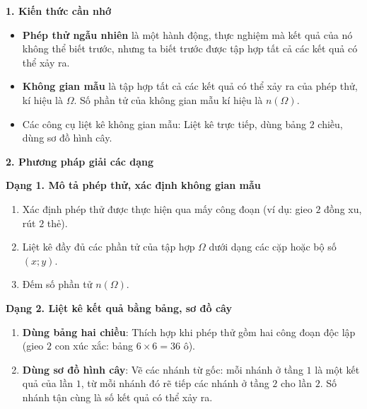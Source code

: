 \textbf{1. Kiến thức cần nhớ}
\begin{itemize}
\item \textbf{Phép thử ngẫu nhiên} là một hành động, thực nghiệm mà kết quả của nó không thể biết trước, nhưng ta biết trước được tập hợp tất cả các kết quả có thể xảy ra.
\item \textbf{Không gian mẫu} là tập hợp tất cả các kết quả có thể xảy ra của phép thử, kí hiệu là $\Omega$. Số phần tử của không gian mẫu kí hiệu là $n(\Omega)$.
\item Các công cụ liệt kê không gian mẫu: Liệt kê trực tiếp, dùng bảng $2$ chiều, dùng sơ đồ hình cây.
\end{itemize}

\textbf{2. Phương pháp giải các dạng}

\textbf{Dạng 1. Mô tả phép thử, xác định không gian mẫu}
\begin{enumerate}
\item Xác định phép thử được thực hiện qua mấy công đoạn (ví dụ: gieo $2$ đồng xu, rút $2$ thẻ).
\item Liệt kê đầy đủ các phần tử của tập hợp $\Omega$ dưới dạng các cặp hoặc bộ số $(x; y)$.
\item Đếm số phần tử $n(\Omega)$.
\end{enumerate}

\textbf{Dạng 2. Liệt kê kết quả bằng bảng, sơ đồ cây}
\begin{enumerate}
\item \textbf{Dùng bảng hai chiều}: Thích hợp khi phép thử gồm hai công đoạn độc lập (gieo $2$ con xúc xắc: bảng $6 \times 6 = 36$ ô).
\item \textbf{Dùng sơ đồ hình cây}: Vẽ các nhánh từ gốc: mỗi nhánh ở tầng $1$ là một kết quả của lần $1$, từ mỗi nhánh đó rẽ tiếp các nhánh ở tầng $2$ cho lần $2$. Số nhánh tận cùng là số kết quả có thể xảy ra.
\end{enumerate}

